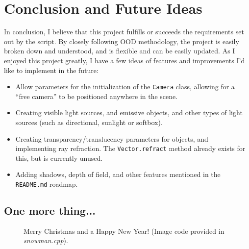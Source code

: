\documentclass[a4paper]{article}
\begin{document}
\section{Conclusion and Future Ideas}
In conclusion, I believe that this project fulfills or succeeds the requirements set out by the script. By closely following OOD methodology, the project is easily broken down and understood, and is flexible and can be easily updated. As I enjoyed this project greatly, I have a few ideas of features and improvements I'd like to implement in the future:
\begin{itemize}
  \item Allow parameters for the initialization of the \verb|Camera| class, allowing for a ``free camera'' to be positioned anywhere in the scene.
  \item Creating visible light sources, and emissive objects, and other types of light sources (such as directional, sunlight or softbox).
  \item Creating transparency/translucency parameters for objects, and implementing ray refraction. The \verb|Vector.refract| method already exists for this, but is currently unused.
  \item Adding shadows, depth of field, and other features mentioned in the \verb|README.md| roadmap.
\end{itemize}
\begin{appendix}
  \section{One more thing...}
  \newpage
  \vfill\null
  \begin{figure}[!h]
    \centering
    \caption{Merry Christmas and a Happy New Year! (Image code provided in {\it snowman.cpp}).}
  \end{figure}
\end{appendix}
\end{document}
